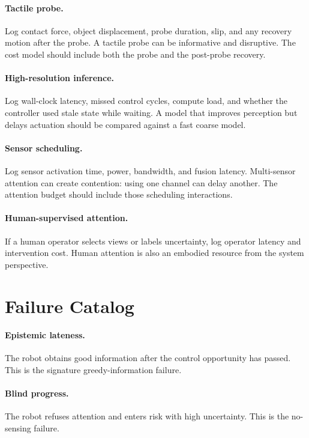 \documentclass{article}
\begin{document}
\paragraph{Tactile probe.}
Log contact force, object displacement, probe duration, slip, and any recovery
motion after the probe. A tactile probe can be informative and disruptive. The
cost model should include both the probe and the post-probe recovery.

\paragraph{High-resolution inference.}
Log wall-clock latency, missed control cycles, compute load, and whether the
controller used stale state while waiting. A model that improves perception
but delays actuation should be compared against a fast coarse model.

\paragraph{Sensor scheduling.}
Log sensor activation time, power, bandwidth, and fusion latency. Multi-sensor
attention can create contention: using one channel can delay another. The
attention budget should include those scheduling interactions.

\paragraph{Human-supervised attention.}
If a human operator selects views or labels uncertainty, log operator latency
and intervention cost. Human attention is also an embodied resource from the
system perspective.

\section{Failure Catalog}

\paragraph{Epistemic lateness.}
The robot obtains good information after the control opportunity has passed.
This is the signature greedy-information failure.

\paragraph{Blind progress.}
The robot refuses attention and enters risk with high uncertainty. This is the
no-sensing failure.
\end{document}

